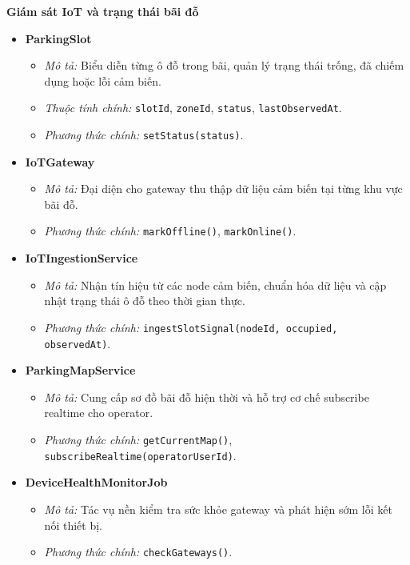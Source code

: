 \newpage
\noindent\textbf{Giám sát IoT và trạng thái bãi đỗ}
\begin{itemize}[leftmargin=1.5cm]
    \item \textbf{ParkingSlot}
    \begin{itemize}
        \item \textit{Mô tả:} Biểu diễn từng ô đỗ trong bãi, quản lý trạng thái trống, đã chiếm dụng hoặc lỗi cảm biến.
        \item \textit{Thuộc tính chính:} \texttt{slotId}, \texttt{zoneId}, \texttt{status}, \texttt{lastObservedAt}.
        \item \textit{Phương thức chính:} \texttt{setStatus(status)}.
    \end{itemize}

    \item \textbf{IoTGateway}
    \begin{itemize}
        \item \textit{Mô tả:} Đại diện cho gateway thu thập dữ liệu cảm biến tại từng khu vực bãi đỗ.
        \item \textit{Phương thức chính:} \texttt{markOffline()}, \texttt{markOnline()}.
    \end{itemize}

    \item \textbf{IoTIngestionService}
    \begin{itemize}
        \item \textit{Mô tả:} Nhận tín hiệu từ các node cảm biến, chuẩn hóa dữ liệu và cập nhật trạng thái ô đỗ theo thời gian thực.
        \item \textit{Phương thức chính:} \texttt{ingestSlotSignal(nodeId, occupied, observedAt)}.
    \end{itemize}

    \item \textbf{ParkingMapService}
    \begin{itemize}
        \item \textit{Mô tả:} Cung cấp sơ đồ bãi đỗ hiện thời và hỗ trợ cơ chế subscribe realtime cho operator.
        \item \textit{Phương thức chính:} \texttt{getCurrentMap()}, \texttt{subscribeRealtime(operatorUserId)}.
    \end{itemize}

    \item \textbf{DeviceHealthMonitorJob}
    \begin{itemize}
        \item \textit{Mô tả:} Tác vụ nền kiểm tra sức khỏe gateway và phát hiện sớm lỗi kết nối thiết bị.
        \item \textit{Phương thức chính:} \texttt{checkGateways()}.
    \end{itemize}


\end{itemize}
